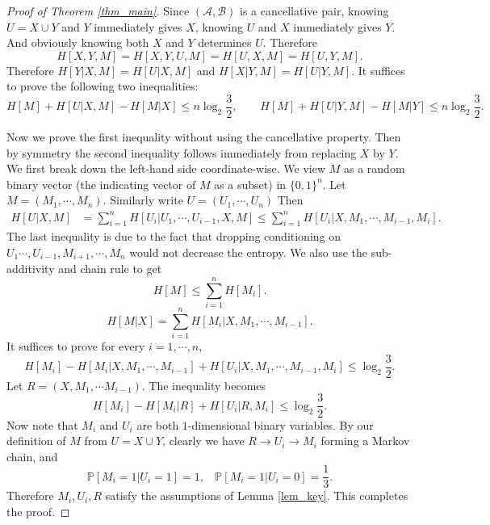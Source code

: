\documentclass{article}
\begin{document}
\begin{proof}[Proof of Theorem \ref{thm_main}]
Since $(\mathcal{A}, \mathcal{B})$ is a cancellative pair, knowing $U=X \cup Y$ and $Y$ immediately gives $X$, knowing $U$ and $X$ immediately gives $Y$. And obviously knowing both $X$ and $Y$ determines $U$. Therefore $$H[X,Y,M]=H[X,Y,U,M]=H[U,X,M]=H[U,Y,M].$$
Therefore $H[Y|X,M]=H[U|X,M]$ and $H[X|Y,M]=H[U|Y,M]$. It suffices to prove the following two inequalities:
$$H[M]+H[U|X,M]-H[M|X] \le n \log_2 \frac{3}{2}, \qquad H[M]+H[U|Y,M]-H[M|Y] \le n \log_2 \frac{3}{2}.$$

Now we prove the first inequality without using the cancellative property. Then by symmetry the second inequality follows immediately from replacing $X$ by $Y$. We first break down the left-hand side coordinate-wise. We view $M$ as a random binary vector (the indicating vector of $M$ as a subset) in $\{0, 1\}^n$. Let $M=(M_1, \cdots, M_n)$. Similarly write $U=(U_1, \cdots, U_n)$ Then 
\begin{align*}
H[U|X, M]&=\sum_{i=1}^n H[U_i|U_1, \cdots, U_{i-1}, X, M] \le \sum_{i=1}^n H[U_i|X, M_1, \cdots, M_{i-1}, M_i].
\end{align*}
The last inequality is due to the fact that dropping conditioning on $U_1 \cdots, U_{i-1}, M_{i+1}, \cdots, M_n$ would not decrease the entropy. We also use the sub-additivity and chain rule to get
$$H[M] \le \sum_{i=1}^n H[M_i].$$
$$H[M|X]=\sum_{i=1}^n H[M_i|X, M_1, \cdots, M_{i-1}].$$
It suffices to prove for every $i=1, \cdots, n$,
$$H[M_i]-H[M_i|X, M_1, \cdots, M_{i-1}]+H[U_i|X, M_1, \cdots, M_{i-1}, M_i] \le \log_2 \frac{3}{2}.$$
Let $R=(X, M_1, \cdots M_{i-1})$. The inequality becomes
$$H[M_i]-H[M_i|R]+H[U_i|R, M_i] \le \log_2 \frac{3}{2}.$$
Now note that $M_i$ and $U_i$ are both $1$-dimensional binary variables. By our definition of $M$ from $U=X \cup Y$, clearly we have $R\to U_i\to M_i$ forming a Markov chain, and
$$\mathbb{P}[M_i=1|U_i=1]=1,~~~~\mathbb{P}[M_i=1|U_i=0]=\frac{1}{3}.$$
Therefore $M_i, U_i, R$ satisfy the assumptions of Lemma \ref{lem_key}. This completes the proof.
\end{proof}
\end{document}
